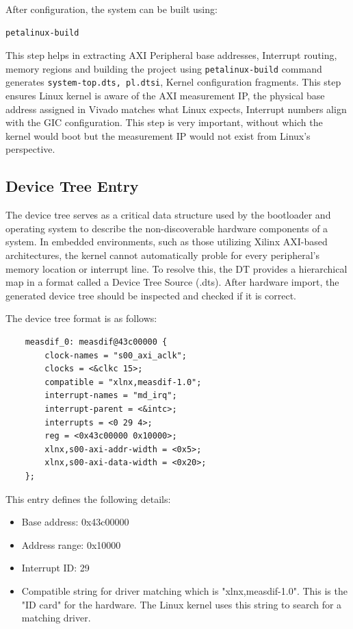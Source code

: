 After configuration, the system can be built using:
\begin{verbatim}
petalinux-build
\end{verbatim}













This step helps in extracting AXI Peripheral base addresses, Interrupt routing, memory regions and building the project using \texttt{petalinux-build} command generates \texttt{system-top.dts,  pl.dtsi}, Kernel configuration fragments. This step ensures Linux kernel is aware of the AXI measurement IP, the physical base address assigned in Vivado matches what Linux expects, Interrupt numbers align with the GIC configuration. This step is very important, without which the kernel would boot but the measurement IP would not exist from Linux’s perspective.


\subsection{Device Tree Entry}
The device tree serves as a critical data structure used by the bootloader and operating system to describe the non-discoverable hardware components of a system. In embedded environments, such as those utilizing Xilinx AXI-based architectures, the kernel cannot automatically proble for every peripheral’s memory location or interrupt line. To resolve this, the DT provides a hierarchical map in a format called a Device Tree Source (.dts).
After hardware import, the generated device tree should be inspected and checked if it is correct. 

The device tree format is as follows: 
\begin{verbatim}
    measdif_0: measdif@43c00000 {
        clock-names = "s00_axi_aclk";
        clocks = <&clkc 15>;
        compatible = "xlnx,measdif-1.0";
        interrupt-names = "md_irq";
        interrupt-parent = <&intc>;
        interrupts = <0 29 4>;
        reg = <0x43c00000 0x10000>;
        xlnx,s00-axi-addr-width = <0x5>;
        xlnx,s00-axi-data-width = <0x20>;
    };
\end{verbatim}

This entry defines the following details:
\begin{itemize}
    \item Base address: 0x43c00000
    \item Address range: 0x10000
    \item Interrupt ID: 29
    \item Compatible string for driver matching which is "xlnx,measdif-1.0". This is the "ID card" for the hardware. The Linux kernel uses this string to search for a matching driver.
\end{itemize}

